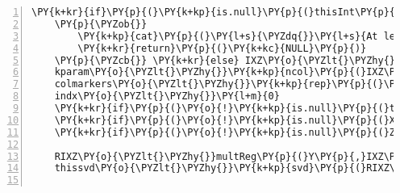 \begin{Verbatim}[commandchars=\\\{\},codes={\catcode`\$=3\catcode`\^=7\catcode`\_=8},gobble=0,numbers=left,fontfamily=fvm,fontshape=n,fontsize=\footnotesize,tabsize=2]
	\PY{k+kr}{if}\PY{p}{(}\PY{k+kp}{is.null}\PY{p}{(}thisInt\PY{p}{)} \PY{o}{\PYZam{}\PYZam{}} \PY{k+kp}{is.null}\PY{p}{(}X\PY{p}{)} \PY{o}{\PYZam{}\PYZam{}} \PY{k+kp}{is.null}\PY{p}{(}Z\PY{p}{)}\PY{p}{)}
	\PY{p}{\PYZob{}}
		\PY{k+kp}{cat}\PY{p}{(}\PY{l+s}{\PYZdq{}}\PY{l+s}{At least one of: Intercept, X and Z must be specified \PYZbs{}n\PYZdq{}}\PY{p}{)}
		\PY{k+kr}{return}\PY{p}{(}\PY{k+kc}{NULL}\PY{p}{)}
	\PY{p}{\PYZcb{}} \PY{k+kr}{else} IXZ\PY{o}{\PYZlt{}\PYZhy{}}\PY{k+kp}{cbind}\PY{p}{(}thisInt\PY{p}{,}X\PY{p}{,}Z\PY{p}{)}
	kparam\PY{o}{\PYZlt{}\PYZhy{}}\PY{k+kp}{ncol}\PY{p}{(}IXZ\PY{p}{)}
	colmarkers\PY{o}{\PYZlt{}\PYZhy{}}\PY{k+kp}{rep}\PY{p}{(}\PY{l+s}{\PYZdq{}}\PY{l+s}{\PYZdq{}}\PY{p}{,}kparam\PY{p}{)}
	indx\PY{o}{\PYZlt{}\PYZhy{}}\PY{l+m}{0}
	\PY{k+kr}{if}\PY{p}{(}\PY{o}{!}\PY{k+kp}{is.null}\PY{p}{(}thisInt\PY{p}{)}\PY{p}{)} colmarkers\PY{p}{[}indx\PY{o}{\PYZlt{}\PYZhy{}}indx\PY{l+m}{+1}\PY{p}{]}\PY{o}{\PYZlt{}\PYZhy{}}\PY{l+s}{\PYZdq{}}\PY{l+s}{I\PYZdq{}}
	\PY{k+kr}{if}\PY{p}{(}\PY{o}{!}\PY{k+kp}{is.null}\PY{p}{(}X\PY{p}{)}\PY{p}{)} colmarkers\PY{p}{[}\PY{p}{(}indx\PY{o}{\PYZlt{}\PYZhy{}}indx\PY{l+m}{+1}\PY{p}{)}\PY{o}{:}\PY{p}{(}indx\PY{o}{\PYZlt{}\PYZhy{}}indx\PY{o}{+}\PY{k+kp}{ncol}\PY{p}{(}X\PY{p}{)}\PY{l+m}{\PYZhy{}1}\PY{p}{)}\PY{p}{]}\PY{o}{\PYZlt{}\PYZhy{}}\PY{l+s}{\PYZdq{}}\PY{l+s}{X\PYZdq{}}
	\PY{k+kr}{if}\PY{p}{(}\PY{o}{!}\PY{k+kp}{is.null}\PY{p}{(}Z\PY{p}{)}\PY{p}{)} colmarkers\PY{p}{[}\PY{p}{(}indx\PY{o}{\PYZlt{}\PYZhy{}}indx\PY{l+m}{+1}\PY{p}{)}\PY{o}{:}\PY{p}{(}indx\PY{o}{\PYZlt{}\PYZhy{}}indx\PY{o}{+}\PY{k+kp}{ncol}\PY{p}{(}Z\PY{p}{)}\PY{l+m}{\PYZhy{}1}\PY{p}{)}\PY{p}{]}\PY{o}{\PYZlt{}\PYZhy{}}\PY{l+s}{\PYZdq{}}\PY{l+s}{Z\PYZdq{}}

	RIXZ\PY{o}{\PYZlt{}\PYZhy{}}multReg\PY{p}{(}Y\PY{p}{,}IXZ\PY{p}{,}createNAvals\PY{o}{=}\PY{k+kc}{TRUE}\PY{p}{,}seed\PY{o}{=}seed\PY{p}{)} 
	thissvd\PY{o}{\PYZlt{}\PYZhy{}}\PY{k+kp}{svd}\PY{p}{(}RIXZ\PY{o}{\PYZdl{}}RES\PY{p}{)}
	

\end{Verbatim}
